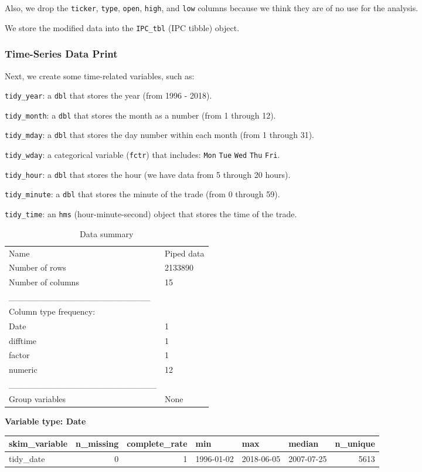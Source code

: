 \documentclass[]{elsarticle} %
\begin{document}
Also, we drop the \texttt{ticker}, \texttt{type}, \texttt{open},
\texttt{high}, and \texttt{low} columns because we think they are of no
use for the analysis.

We store the modified data into the \texttt{IPC\_tbl} (IPC tibble)
object.

\hypertarget{time-series-data-print}{%
\subsubsection{Time-Series Data Print}\label{time-series-data-print}}

Next, we create some time-related variables, such as:

\texttt{tidy\_year}: a \texttt{dbl} that stores the year (from 1996 -
2018).

\texttt{tidy\_month}: a \texttt{dbl} that stores the month as a number
(from 1 through 12).

\texttt{tidy\_mday}: a \texttt{dbl} that stores the day number within
each month (from 1 through 31).

\texttt{tidy\_wday}: a categorical variable (\texttt{fctr}) that
includes: \texttt{Mon} \texttt{Tue} \texttt{Wed} \texttt{Thu}
\texttt{Fri}.

\texttt{tidy\_hour}: a \texttt{dbl} that stores the hour (we have data
from 5 through 20 hours).

\texttt{tidy\_minute}: a \texttt{dbl} that stores the minute of the
trade (from 0 through 59).

\texttt{tidy\_time}: an \texttt{hms} (hour-minute-second) object that
stores the time of the trade.

\begin{longtable}[]{@{}ll@{}}
\caption{Data summary}\tabularnewline
\toprule
\endhead
Name & Piped data\tabularnewline
Number of rows & 2133890\tabularnewline
Number of columns & 15\tabularnewline
\_\_\_\_\_\_\_\_\_\_\_\_\_\_\_\_\_\_\_\_\_\_\_ &\tabularnewline
Column type frequency: &\tabularnewline
Date & 1\tabularnewline
difftime & 1\tabularnewline
factor & 1\tabularnewline
numeric & 12\tabularnewline
\_\_\_\_\_\_\_\_\_\_\_\_\_\_\_\_\_\_\_\_\_\_\_\_ &\tabularnewline
Group variables & None\tabularnewline
\bottomrule
\end{longtable}

\textbf{Variable type: Date}

\begin{longtable}[]{@{}lrrlllr@{}}
\toprule
skim\_variable & n\_missing & complete\_rate & min & max & median &
n\_unique\tabularnewline
\midrule
\endhead
tidy\_date & 0 & 1 & 1996-01-02 & 2018-06-05 & 2007-07-25 &
5613\tabularnewline
\bottomrule
\end{longtable}
\end{document}
